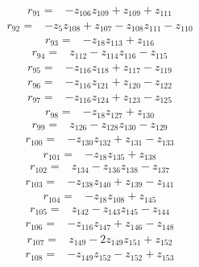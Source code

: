\begin{align*}
r_{91}={}&-z_{106}z_{109} +z_{109} +z_{111}
\end{align*}
\begin{align*}
r_{92}={}&-z_{5}z_{108} +z_{107} -z_{108}z_{111} -z_{110}
\end{align*}
\begin{align*}
r_{93}={}&-z_{18}z_{113} +z_{116}
\end{align*}
\begin{align*}
r_{94}={}&z_{112} -z_{114}z_{116} -z_{115}
\end{align*}
\begin{align*}
r_{95}={}&-z_{116}z_{118} +z_{117} -z_{119}
\end{align*}
\begin{align*}
r_{96}={}&-z_{116}z_{121} +z_{120} -z_{122}
\end{align*}
\begin{align*}
r_{97}={}&-z_{116}z_{124} +z_{123} -z_{125}
\end{align*}
\begin{align*}
r_{98}={}&-z_{18}z_{127} +z_{130}
\end{align*}
\begin{align*}
r_{99}={}&z_{126} -z_{128}z_{130} -z_{129}
\end{align*}
\begin{align*}
r_{100}={}&-z_{130}z_{132} +z_{131} -z_{133}
\end{align*}
\begin{align*}
r_{101}={}&-z_{18}z_{135} +z_{138}
\end{align*}
\begin{align*}
r_{102}={}&z_{134} -z_{136}z_{138} -z_{137}
\end{align*}
\begin{align*}
r_{103}={}&-z_{138}z_{140} +z_{139} -z_{141}
\end{align*}
\begin{align*}
r_{104}={}&-z_{18}z_{108} +z_{145}
\end{align*}
\begin{align*}
r_{105}={}&z_{142} -z_{143}z_{145} -z_{144}
\end{align*}
\begin{align*}
r_{106}={}&-z_{116}z_{147} +z_{146} -z_{148}
\end{align*}
\begin{align*}
r_{107}={}&z_{149} -2z_{149}z_{151} +z_{152}
\end{align*}
\begin{align*}
r_{108}={}&-z_{149}z_{152} -z_{152} +z_{153}
\end{align*}
